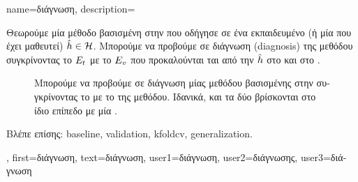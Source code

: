 {name={\foreignlanguage{greek}{διάγνωση}},
	description={\foreignlanguage{greek}{Θεωρούμε μία μέθοδο βασισμένη στην} 
		\foreignlanguage{greek}{που οδήγησε σε ένα εκπαιδευμένο}  
		(\foreignlanguage{greek}{ή μία}  \foreignlanguage{greek}{που έχει μαθευτεί}) $\hat{h} \in \mathcal{H}$. 
		\foreignlanguage{greek}{Μπορούμε να προβούμε σε διάγνωση} (diagnosis) \foreignlanguage{greek}{της μεθόδου συγκρίνοντας το} 
		 $E_{t}$ \foreignlanguage{greek}{με το}  $E_{v}$ 
		\foreignlanguage{greek}{που προκαλούνται ται από την $\hat{h}$ στο}  \foreignlanguage{greek}{και 
		στο} . 
		\begin{figure}[H]
			\begin{center}
			\end{center}
		{
		\caption{\foreignlanguage{greek}{Μπορούμε να προβούμε σε  διάγνωση μίας μεθόδου}  \foreignlanguage{greek}{βασισμένης 
			στην}  \foreignlanguage{greek}{συγκρίνοντας το}  \foreignlanguage{greek}{με το}
			 \foreignlanguage{greek}{της μεθόδου. Ιδανικά, και τα δύο βρίσκονται στο ίδιο επίπεδο με μία} 
			.\label{fig_diagnosis_dict}} }
		\end{figure}
		\foreignlanguage{greek}{Βλέπε επίσης:} \gls{baseline}, \gls{validation}, \gls{kfoldcv}, \gls{generalization}.},
	first={\foreignlanguage{greek}{διάγνωση}},
	text={\foreignlanguage{greek}{διάγνωση}},
	user1={\foreignlanguage{greek}{διάγνωση}}, %
  	user2={\foreignlanguage{greek}{διάγνωσης}}, %
	user3={\foreignlanguage{greek}{διάγνωση}} %
} 

